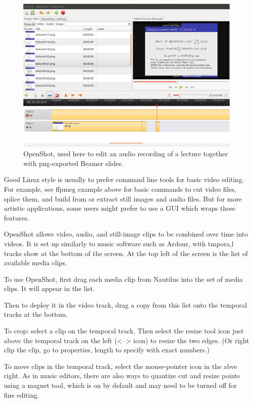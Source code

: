 \documentclass[oneside,english]{scrbook}
\begin{document}
\begin{figure}
  \centering
  \includegraphics[width=\columnwidth]{figs/openshot.png}
	\caption{OpenShot, used here to edit an audio recording of a lecture together with png-exported Beamer slides.}
  \label{fig:jack-settings}
\end{figure}

Good Linux style is usually to prefer command line tools for basic video editing. For example, see ffpmeg example above for basic commands to cut video files, splice them, and build from or extract still images and audio files.  But for more artistic applications, some users might prefer to use a GUI which wraps these features.

OpenShot allows video, audio, and still-image clips to be combined over time into videos.  It is set up similarly to music software such as Ardour, with tmpora,l tracks show at the bottom of the screen.   At the top left of the screen is the list of available media clips.  

To use OpenShot, first drag each media clip from Nautilus into the set of media clips.  It will appear in the list.  

Then to deploy it in the video track, drag a copy from this list onto the temporal tracks at the bottom.

To crop: select a clip on the temporal track. Then select the resize tool icon just above the temporal track on the left (<--> icon) to resize the two edges.  (Or right clip the clip, go to properties, length to specify with exact numbers.)

To move clips in the temporal track, select the mouse-pointer icon in the abve right.   As in music editors, there are also ways to quantize cut and resize points using a magnet tool, which is on by default and may need to be turned off for fine editing.
\end{document}

